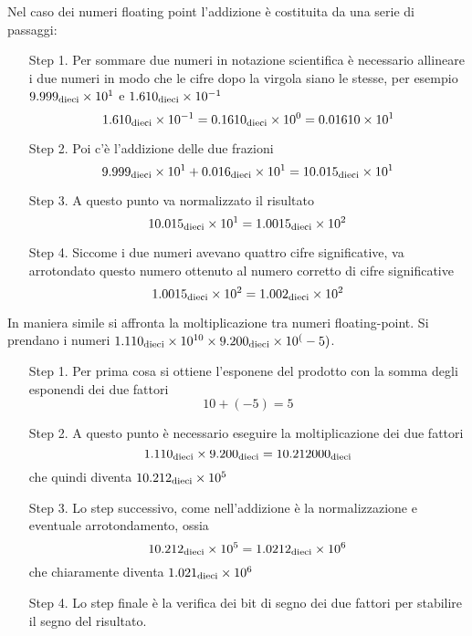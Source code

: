 \documentclass[a4paper,12pt]{article}
\theoremstyle{break}
\numberwithin{equation}{section}
\begin{document}
    Nel caso dei numeri floating point l'addizione è costituita da una serie di passaggi:
    \begin{itemize}
        \item[Step 1.] Per sommare due numeri in notazione scientifica è necessario allineare i due numeri in modo che le cifre dopo la virgola siano le stesse, per esempio \( 9.999_{\mbox{\scriptsize dieci}} \times 10^1\) e \(1.610_{\mbox{\scriptsize dieci}} \times 10^{-1}\) 
        \[
            1.610_{\mbox{\scriptsize dieci}} \times 10^{-1} = 0.1610_{\mbox{\scriptsize dieci}} \times 10^0 = 0.01610 \times 10^1
        \]
        \item[Step 2.] Poi c'è l'addizione delle due frazioni \[9.999_{\mbox{\scriptsize dieci}} \times 10^1 + 0.016_{\mbox{\scriptsize dieci}} \times 10^1 = 10.015_{\mbox{\scriptsize dieci}} \times 10^1\]
        \item[Step 3.] A questo punto va normalizzato il risultato \[10.015_{\mbox{\scriptsize dieci}} \times 10^1 = 1.0015_{\mbox{\scriptsize dieci}}\times 10^2\]  
        \item[Step 4.] Siccome i due numeri avevano quattro cifre significative, va arrotondato questo numero ottenuto al numero corretto di cifre significative
        \[
           1.0015_{\mbox{\scriptsize dieci}} \times 10^2 = 1.002_{\mbox{\scriptsize dieci}} \times 10^2 
        \] 
    \end{itemize}
In maniera simile si affronta la moltiplicazione tra numeri floating-point. Si prendano i numeri \(1.110_{\mbox{\scriptsize dieci}} \times 10^{10} \times 9.200_{\mbox{\scriptsize dieci}} \times 10^(-5)\).
\begin{itemize}
    \item[Step 1.] Per prima cosa si ottiene l'esponene del prodotto con la somma degli esponendi dei due fattori  
    \[
        10 + (-5) = 5
    \] 
    \item[Step 2.] A questo punto è necessario eseguire la moltiplicazione dei due fattori 
    \[1.110_{\mbox{\scriptsize dieci}} \times 9.200_{\mbox{\scriptsize dieci}} = 10.212000_{\mbox{\scriptsize dieci}}\]
     che quindi diventa \(10.212_{\mbox{\scriptsize dieci}} \times 10^5\)
    \item[Step 3.] Lo step successivo, come nell'addizione è la normalizzazione e eventuale arrotondamento, ossia
    \[
        10.212_{\mbox{\scriptsize dieci}} \times 10^5 = 1.0212_{\mbox{\scriptsize dieci}} \times 10^6
    \]  
    che chiaramente diventa \(1.021_{\mbox{\scriptsize dieci}} \times 10^6\)
    \item[Step 4.] Lo step finale è la verifica dei bit di segno dei due fattori per stabilire il segno del risultato.
\end{itemize}
\end{document}
